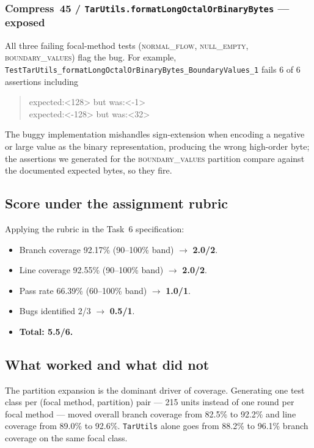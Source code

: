 \documentclass[conference]{IEEEtran}
\begin{document}
\subsubsection*{Compress~45 / \texttt{TarUtils.\linebreak formatLongOctalOrBinaryBytes} --- exposed}
All three failing focal-method tests
(\textsc{normal\_flow}, \textsc{null\_empty},
\textsc{boundary\_values}) flag the bug. For example,
\texttt{Test\-TarUtils\_\linebreak format\-Long\-Octal\-Or\-Binary\-Bytes\_\linebreak Boundary\-Values\_1}
fails 6 of 6 assertions including
\begin{quote}\small\ttfamily
expected:<128> but was:<-1>\\
expected:<-128> but was:<32>
\end{quote}
The buggy implementation mishandles sign-extension when encoding a
negative or large value as the binary representation, producing the
wrong high-order byte; the assertions we generated for the
\textsc{boundary\_values} partition compare against the documented
expected bytes, so they fire.

\subsection{Score under the assignment rubric}
Applying the rubric in the Task~6 specification:
\begin{itemize}
  \item Branch coverage 92.17\% (90--100\% band) $\rightarrow$
        \textbf{2.0/2}.
  \item Line coverage 92.55\% (90--100\% band) $\rightarrow$
        \textbf{2.0/2}.
  \item Pass rate 66.39\% (60--100\% band) $\rightarrow$
        \textbf{1.0/1}.
  \item Bugs identified 2/3 $\rightarrow$ \textbf{0.5/1}.
  \item \textbf{Total: 5.5/6.}
\end{itemize}

\subsection{What worked and what did not}
The partition expansion is the dominant driver of coverage. Generating
one test class per (focal method, partition) pair --- 215 units
instead of one round per focal method --- moved overall branch
coverage from 82.5\% to 92.2\% and line coverage from 89.0\% to
92.6\%. \texttt{TarUtils} alone goes from 88.2\% to 96.1\% branch
coverage on the same focal class.
\end{document}
